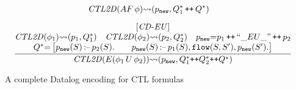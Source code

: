 \documentclass[acmsmall,screen,review,anonymous,nonacm]{acmart}
\begin{document}
\begin{figure*}[!h]
\begin{gather*}
{}{\mathit{CTL2D}(AF\,\phi){\rightsquigarrow} (p_{\mathtt{new}}, Q^*_1 \operatorname{{\text{\ttfamily {++}}}}Q^*)
}
\\[0.5em] 
{\quad 
\frac{
\begin{matrix}
[\mathit{CD}\text{-}\mathit{EU}]\\
\mathit{CTL2D}(\phi_{1}){\rightsquigarrow} (p_{1}, Q^*_1) \quad \mathit{CTL2D}(\phi_{2}){\rightsquigarrow} (p_{2}, Q^*_2)\quad  
p_{\mathtt{new}} {=} p_{1} \operatorname{{\text{\ttfamily {++}}}}\ensuremath{``\_EU\_"} \operatorname{{\text{\ttfamily {++}}}}p_{2}\\ 
Q^* {=}  
\left[ 
  \begin{matrix} 
    p_{\mathtt{new}}(S) \,\text{:--}\,p_{2}(S). \qquad 
    p_{\mathtt{new}}(S) \,\text{:--}\,p_{1}(S), \mathtt{flow}(S,S'), p_{\mathtt{new}}(S').
  \end{matrix} \right]
\end{matrix}
}{\mathit{CTL2D}(E ( \phi_{1} \,U\, \phi_{2}) ){\rightsquigarrow} (p_{\mathtt{new}}, Q^*_1 {\operatorname{{\text{\ttfamily {++}}}}} Q^*_2 {\operatorname{{\text{\ttfamily {++}}}}} Q^*)
}} 
\end{gather*}
\caption{A complete Datalog encoding for 
CTL formulas}
\label{fig:comlete_ctl-datalog-translation-table-ctl}
\end{figure*}
\end{document}
